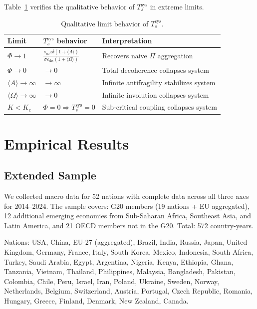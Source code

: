 \documentclass[12pt]{article}
\theoremstyle{plain}
\theoremstyle{definition}
\theoremstyle{remark}
\begin{document}
Table~\ref{tab:limits} verifies the qualitative behavior of $T_s^{\text{sys}}$ in extreme limits.

\begin{table}[h]
\centering
\caption{Qualitative limit behavior of $T_s^{\text{sys}}$.}
\label{tab:limits}
{\small\begin{tabular}{lll}
\toprule
Limit & $T_s^{\text{sys}}$ behavior & Interpretation \\
\midrule
$\Phi \to 1$ & $\frac{s_{iii}z\delta(1+\langle A\rangle)}{\sigma\varepsilon_{\text{dis}}(1+\langle\Omega\rangle)}$ & Recovers naive $\Pi$ aggregation \\
$\Phi \to 0$ & $\to 0$ & Total decoherence collapses system \\
$\langle A\rangle \to \infty$ & $\to \infty$ & Infinite antifragility stabilizes system \\
$\langle\Omega\rangle \to \infty$ & $\to 0$ & Infinite involution collapses system \\
$K < K_c$ & $\Phi = 0 \Rightarrow T_s^{\text{sys}} = 0$ & Sub-critical coupling collapses system \\
\bottomrule
\end{tabular}}
\end{table}

\section{Empirical Results}
\label{sec:empirical}

\subsection{Extended Sample}

We collected macro data for 52 nations with complete data across all three axes for 2014--2024. The sample covers: G20 members (19 nations + EU aggregated), 12 additional emerging economies from Sub-Saharan Africa, Southeast Asia, and Latin America, and 21 OECD members not in the G20. Total: 572 country-years.

Nations: USA, China, EU-27 (aggregated), Brazil, India, Russia, Japan, United Kingdom, Germany, France, Italy, South Korea, Mexico, Indonesia, South Africa, Turkey, Saudi Arabia, Egypt, Argentina, Nigeria, Kenya, Ethiopia, Ghana, Tanzania, Vietnam, Thailand, Philippines, Malaysia, Bangladesh, Pakistan, Colombia, Chile, Peru, Israel, Iran, Poland, Ukraine, Sweden, Norway, Netherlands, Belgium, Switzerland, Austria, Portugal, Czech Republic, Romania, Hungary, Greece, Finland, Denmark, New Zealand, Canada.
\end{document}

